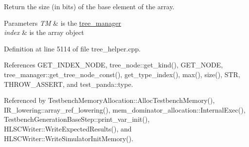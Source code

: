 Return the size (in bits) of the base element of the array. 


\begin{DoxyParams}{Parameters}
{\em TM} & is the \hyperlink{classtree__manager}{tree\+\_\+manager} \\
\hline
{\em index} & is the array object \\
\hline
\end{DoxyParams}


Definition at line 5114 of file tree\+\_\+helper.\+cpp.



References G\+E\+T\+\_\+\+I\+N\+D\+E\+X\+\_\+\+N\+O\+DE, tree\+\_\+node\+::get\+\_\+kind(), G\+E\+T\+\_\+\+N\+O\+DE, tree\+\_\+manager\+::get\+\_\+tree\+\_\+node\+\_\+const(), get\+\_\+type\+\_\+index(), max(), size(), S\+TR, T\+H\+R\+O\+W\+\_\+\+A\+S\+S\+E\+RT, and test\+\_\+panda\+::type.



Referenced by Testbench\+Memory\+Allocation\+::\+Alloc\+Testbench\+Memory(), I\+R\+\_\+lowering\+::array\+\_\+ref\+\_\+lowering(), mem\+\_\+dominator\+\_\+allocation\+::\+Internal\+Exec(), Testbench\+Generation\+Base\+Step\+::print\+\_\+var\+\_\+init(), H\+L\+S\+C\+Writer\+::\+Write\+Expected\+Results(), and H\+L\+S\+C\+Writer\+::\+Write\+Simulator\+Init\+Memory().

